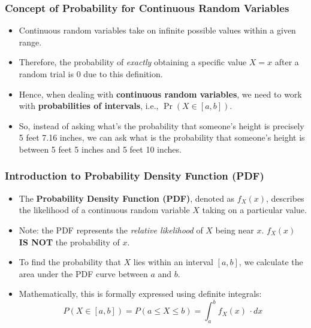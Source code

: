 \documentclass[handout]{beamer} %
\begin{document}
\begin{frame}
\frametitle{Concept of Probability for Continuous Random Variables}
    \begin{itemize}
        \item Continuous random variables take on infinite possible values within a given range. \pause
        \item Therefore, the probability of \emph{exactly} obtaining a specific value $X=x$ after a random trial is $0$ due to this definition. \pause
        \item Hence, when dealing with \textbf{continuous random variables}, we need to work with \textbf{probabilities of intervals}, i.e., $\Pr(X \in [a,b])$. \pause
        \item So, instead of asking what's the probability that someone's height is precisely 5 feet 7.16 inches, we can ask what is the probability that someone's height is between 5 feet 5 inches and 5 feet 10 inches.
    \end{itemize}
\end{frame}

\begin{frame}
\frametitle{Introduction to Probability Density Function (PDF)}
    \begin{itemize}
        \item The \textbf{Probability Density Function (PDF)}, denoted as $f_X(x)$, describes the likelihood of a continuous random variable $X$ taking on a particular value. \pause
        \item Note: the PDF represents the \emph{relative likelihood} of $X$ being near $x$. $f_X(x)$ \textbf{IS NOT} the probability of $x$.  \pause
        \item To find the probability that $X$ lies within an interval $[a, b]$, we calculate the area under the PDF curve between $a$ and $b$. \pause
        \item Mathematically, this is formally expressed using definite integrals:
        \[
        P(X\in [a,b]) = P(a \leq X \leq b) = \int_{a}^{b} f_X(x) \, \cdot dx
        \] 
    \end{itemize}
\end{frame}
\end{document}
